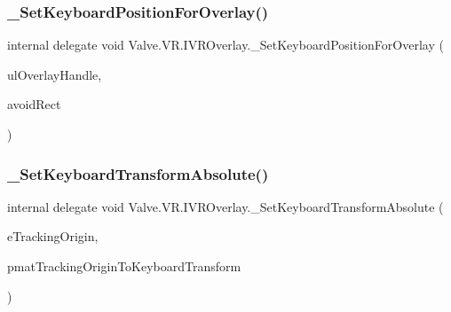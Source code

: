 \mbox{\label{struct_valve_1_1_v_r_1_1_i_v_r_overlay_a2caf87222d0045e8ad341e4ede54a985}} 
\subsubsection{\texorpdfstring{\_SetKeyboardPositionForOverlay()}{\_SetKeyboardPositionForOverlay()}}
{\footnotesize\ttfamily internal delegate void Valve.\+V\+R.\+I\+V\+R\+Overlay.\+\_\+\+Set\+Keyboard\+Position\+For\+Overlay (\begin{DoxyParamCaption}\item[{ulong}]{ul\+Overlay\+Handle,  }\item[{\mbox{\hyperlink{struct_valve_1_1_v_r_1_1_hmd_rect2__t}{Hmd\+Rect2\+\_\+t}}}]{avoid\+Rect }\end{DoxyParamCaption})}

\mbox{\label{struct_valve_1_1_v_r_1_1_i_v_r_overlay_a972e7074df2f3719f9df1233d0d4bab9}} 
\subsubsection{\texorpdfstring{\_SetKeyboardTransformAbsolute()}{\_SetKeyboardTransformAbsolute()}}
{\footnotesize\ttfamily internal delegate void Valve.\+V\+R.\+I\+V\+R\+Overlay.\+\_\+\+Set\+Keyboard\+Transform\+Absolute (\begin{DoxyParamCaption}\item[{\mbox{\hyperlink{namespace_valve_1_1_v_r_a29be99a3c2f780157bd490db06a7f12f}{E\+Tracking\+Universe\+Origin}}}]{e\+Tracking\+Origin,  }\item[{ref \mbox{\hyperlink{struct_valve_1_1_v_r_1_1_hmd_matrix34__t}{Hmd\+Matrix34\+\_\+t}}}]{pmat\+Tracking\+Origin\+To\+Keyboard\+Transform }\end{DoxyParamCaption})}

\mbox{\label{struct_valve_1_1_v_r_1_1_i_v_r_overlay_a5bdec940e24ef87b9e12c5e9f91862f0}} 

